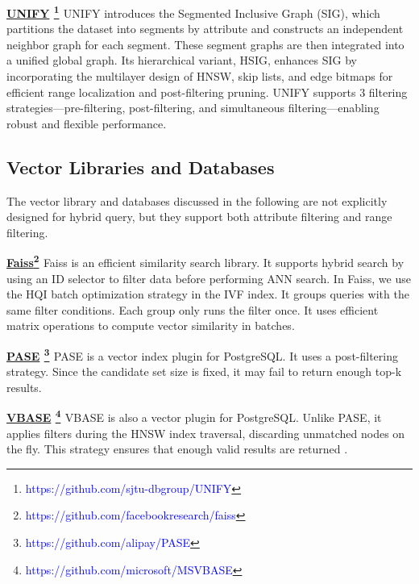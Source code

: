 \documentclass[sigconf, nonacm]{acmart}
\begin{document}
{	\noindent\textbf{\underline{UNIFY} \footnote{\textcolor{blue}{https://github.com/sjtu-dbgroup/UNIFY}} \cite{UNIFY}}
	UNIFY introduces the Segmented Inclusive Graph (SIG), which partitions the dataset into segments by attribute and constructs an independent neighbor graph for each segment. These segment graphs are then integrated into a unified global graph. Its hierarchical variant, HSIG, enhances SIG by incorporating the multilayer design of HNSW, skip lists, and edge bitmaps for efficient range localization and post-filtering pruning. UNIFY supports 3 filtering strategies—pre-filtering, post-filtering, and  simultaneous filtering—enabling robust and flexible performance.
	
	
	
	\subsection{Vector Libraries and Databases}
The vector library and databases discussed in the following are not explicitly designed for hybrid query, but they support both attribute filtering and range filtering. 

\noindent\textbf{\underline{Faiss}\footnote{\textcolor{blue}{https://github.com/facebookresearch/faiss}} \cite{Faiss}}
Faiss is an efficient similarity search library. It supports hybrid search by using an ID selector to filter data before performing ANN search.
In Faiss, we use the HQI batch optimization strategy in the IVF index. It groups queries with the same filter conditions. Each group only runs the filter once. It uses efficient matrix operations to compute vector similarity in batches.

\noindent\textbf{\underline{PASE} \footnote{\textcolor{blue}{https://github.com/alipay/PASE}} \cite{pase}} PASE is a vector index plugin for PostgreSQL. It uses a post-filtering strategy. Since the candidate set size is fixed, it may fail to return enough top-k results.

\noindent\textbf{\underline{VBASE} \footnote{\textcolor{blue}{https://github.com/microsoft/MSVBASE}} \cite{vbase}} VBASE is also a vector plugin for PostgreSQL. Unlike PASE, it applies filters during the HNSW index traversal, discarding unmatched nodes on the fly. This strategy ensures that enough valid results are returned .



}
\end{document}

